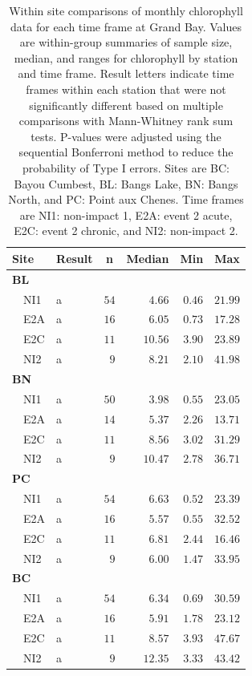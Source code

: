 \documentclass[letterpaper,12pt]{article}\usepackage[]{graphicx}\usepackage[]{color}
\begin{document}
\clearpage

\begin{table}[!tbp]
\caption{Within site comparisons  of monthly chlorophyll data for each time frame at Grand Bay.  Values are within-group summaries of sample size, median, and ranges for chlorophyll by station and time frame.  Result letters indicate time frames within each station that were not significantly different based on multiple comparisons with Mann-Whitney rank sum tests.  P-values were adjusted using the sequential Bonferroni method to reduce the probability of Type I errors. Sites are BC: Bayou Cumbest, BL: Bangs Lake, BN: Bangs North, and PC: Point aux Chenes.  Time frames are NI1: non-impact 1, E2A: event 2 acute, E2C: event 2 chronic, and NI2: non-impact 2.\label{tab:chltab}} 
\begin{center}
\begin{tabular}{llrrrr}
\hline\hline
\multicolumn{1}{l}{Site}&\multicolumn{1}{c}{Result}&\multicolumn{1}{c}{n}&\multicolumn{1}{c}{Median}&\multicolumn{1}{c}{Min}&\multicolumn{1}{c}{Max}\tabularnewline
\hline
{\bfseries BL}&&&&&\tabularnewline
~~NI1&a&$54$&$ 4.66$&$0.46$&$21.99$\tabularnewline
~~E2A&a&$16$&$ 6.05$&$0.73$&$17.28$\tabularnewline
~~E2C&a&$11$&$10.56$&$3.90$&$23.89$\tabularnewline
~~NI2&a&$ 9$&$ 8.21$&$2.10$&$41.98$\tabularnewline
\hline
{\bfseries BN}&&&&&\tabularnewline
~~NI1&a&$50$&$ 3.98$&$0.55$&$23.05$\tabularnewline
~~E2A&a&$14$&$ 5.37$&$2.26$&$13.71$\tabularnewline
~~E2C&a&$11$&$ 8.56$&$3.02$&$31.29$\tabularnewline
~~NI2&a&$ 9$&$10.47$&$2.78$&$36.71$\tabularnewline
\hline
{\bfseries PC}&&&&&\tabularnewline
~~NI1&a&$54$&$ 6.63$&$0.52$&$23.39$\tabularnewline
~~E2A&a&$16$&$ 5.57$&$0.55$&$32.52$\tabularnewline
~~E2C&a&$11$&$ 6.81$&$2.44$&$16.46$\tabularnewline
~~NI2&a&$ 9$&$ 6.00$&$1.47$&$33.95$\tabularnewline
\hline
{\bfseries BC}&&&&&\tabularnewline
~~NI1&a&$54$&$ 6.34$&$0.69$&$30.59$\tabularnewline
~~E2A&a&$16$&$ 5.91$&$1.78$&$23.12$\tabularnewline
~~E2C&a&$11$&$ 8.57$&$3.93$&$47.67$\tabularnewline
~~NI2&a&$ 9$&$12.35$&$3.33$&$43.42$\tabularnewline
\hline
\end{tabular}\end{center}
\end{table}

\clearpage
\end{document}
